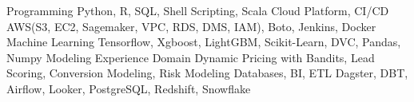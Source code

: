 \begin{cvskills}
\cvskill
{Programming} 
{Python, R, SQL, Shell Scripting, Scala}
\cvskill
{Cloud Platform, CI/CD} 
{AWS(S3, EC2, Sagemaker, VPC, RDS, DMS, IAM), Boto, Jenkins, Docker}
\cvskill
{Machine Learning} 
{Tensorflow, Xgboost, LightGBM, Scikit-Learn, DVC, Pandas, Numpy}
\cvskill
{Modeling Experience Domain} 
{Dynamic Pricing with Bandits, Lead Scoring, Conversion Modeling, Risk Modeling}
\cvskill
{Databases, BI, ETL}
{Dagster, DBT, Airflow, Looker, PostgreSQL, Redshift, Snowflake}
\end{cvskills}